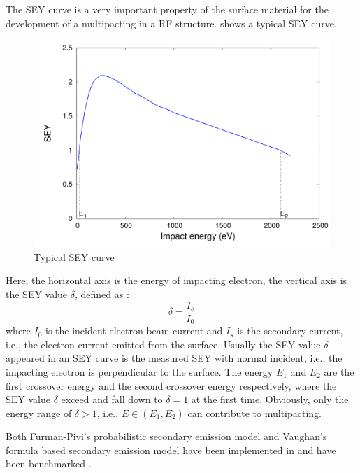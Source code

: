 The SEY curve is a very important property of the surface material for the development of a multipacting in a RF structure.   shows a typical SEY curve.
\begin{figure}[ht]
 \begin{center}
 \includegraphics[width=0.8\linewidth,angle=0]{figures/Multipacting/SEY_curve.pdf}
  \caption{Typical SEY curve}
  \label{fig:typicalSEY}
 \end{center}
\end{figure}
Here, the horizontal axis is the energy of impacting electron, the vertical axis is the SEY value $\delta$, defined as \cite{Furman-Pivi}:
 \begin{equation}
\delta = \frac{I_s}{I_0} \label{eq:SEY}
\end{equation}
where $I_0$ is the incident electron beam current and $I_s$ is the secondary current, i.e., the electron current emitted from the surface. Usually the SEY value $\delta$ appeared in an SEY curve is the measured SEY with normal incident, i.e., the impacting electron is perpendicular to the surface. The energy $E_1$ and $E_2$ are the first crossover energy and the second crossover energy respectively, where the SEY value $\delta$ exceed and fall down to $\delta = 1$ at the first time. Obviously, only the energy range of $\delta>1$, i.e., $E \in (E_1,E_2)$ can contribute to multipacting.

Both Furman-Pivi's probabilistic secondary emission model \cite{Furman-Pivi} and Vaughan's formula based secondary emission model \cite{Vaughan} have been implemented in \opal and have been benchmarked .

